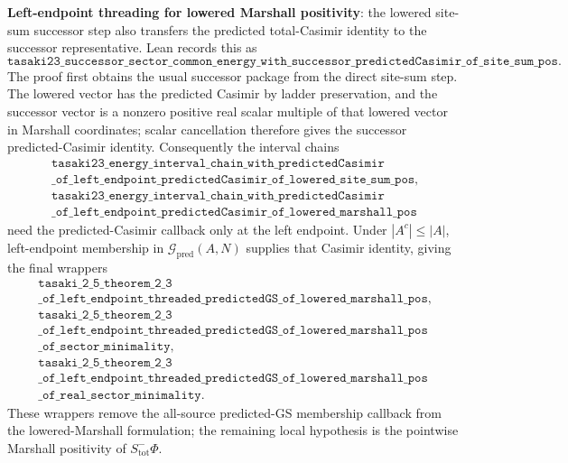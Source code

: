 \documentclass[a4paper,11pt]{article}
\begin{document}
\textbf{Left-endpoint threading for lowered Marshall positivity}: the
lowered site-sum successor step also transfers the predicted total-Casimir
identity to the successor representative.  Lean records this as
\[
\texttt{tasaki23\_successor\_sector\_common\_energy}
\texttt{\_with\_successor\_predictedCasimir\_of\_site\_sum\_pos}.
\]
The proof first obtains the usual successor package from the direct
site-sum step.  The lowered vector has the predicted Casimir by ladder
preservation, and the successor vector is a nonzero positive real scalar
multiple of that lowered vector in Marshall coordinates; scalar cancellation
therefore gives the successor predicted-Casimir identity.  Consequently the
interval chains
\[
\begin{gathered}
\texttt{tasaki23\_energy\_interval\_chain\_with\_predictedCasimir}\\
\texttt{\_of\_left\_endpoint\_predictedCasimir\_of\_lowered\_site\_sum\_pos},\\
\texttt{tasaki23\_energy\_interval\_chain\_with\_predictedCasimir}\\
\texttt{\_of\_left\_endpoint\_predictedCasimir\_of\_lowered\_marshall\_pos}
\end{gathered}
\]
need the predicted-Casimir callback only at the left endpoint.  Under
\(|A^c|\le |A|\), left-endpoint membership in
\(\mathcal G_{\mathrm{pred}}(A,N)\) supplies that Casimir identity, giving
the final wrappers
\[
\begin{gathered}
\texttt{tasaki\_2\_5\_theorem\_2\_3}\\
\texttt{\_of\_left\_endpoint\_threaded\_predictedGS\_of\_lowered\_marshall\_pos},\\
\texttt{tasaki\_2\_5\_theorem\_2\_3}\\
\texttt{\_of\_left\_endpoint\_threaded\_predictedGS\_of\_lowered\_marshall\_pos}\\
\texttt{\_of\_sector\_minimality},\\
\texttt{tasaki\_2\_5\_theorem\_2\_3}\\
\texttt{\_of\_left\_endpoint\_threaded\_predictedGS\_of\_lowered\_marshall\_pos}\\
\texttt{\_of\_real\_sector\_minimality}.
\end{gathered}
\]
These wrappers remove the all-source predicted-GS membership callback from
the lowered-Marshall formulation; the remaining local hypothesis is the
pointwise Marshall positivity of \(S^-_{\mathrm{tot}}\Phi\).
\end{document}
